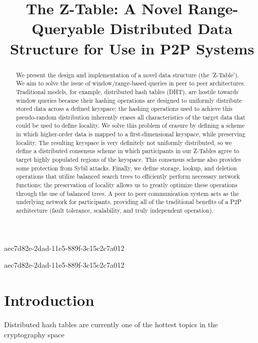 \documentclass[12pt]{article}
\title{The Z-Table: A Novel Range-Queryable Distributed Data Structure for Use in P2P Systems}
\begin{document}
aec7d82e-2dad-11e5-889f-3c15c2c7a012
\maketitle

\begin{abstract}
We present the design and implementation of a novel data structure (the 'Z-Table'). We aim to solve the issue of window/range-based queries in peer to peer architectures. Traditional models, for example,  distributed hash tables (DHT), are hostile towards window queries because their hashing operations are designed to uniformly distribute stored data across a defined keyspace; the hashing operations used to achieve this pseudo-random distribution inherently erases all characteristics of the target data that could be used to define locality. We solve this problem of erasure by defining a scheme in which higher-order data is mapped to a first-dimensional keyspace, while preserving locality. The resulting keyspace is very definitely not uniformly distributed, so we define a distributed consensus scheme in which participants in our Z-Tables agree to target highly populated regions of the keyspace. This consensus scheme also provides some protection from Sybil attacks. Finally, we define storage, lookup, and deletion operations that utilize balanced search trees to efficiently perform necessary network functions; the preservation of locality allows us to greatly optimize these operations through the use of balanced trees. A peer to peer communication system acts as the underlying network for participants, providing all of the traditional benefits of a P2P architecture (fault tolerance, scalability, and truly independent operation).
\end{abstract}
aec7d82e-2dad-11e5-889f-3c15c2c7a012

\newpage
\section{Introduction}
Distributed hash tables are currently one of the hottest topics in the cryptography space~\cite{Stoica:2001dj,Rowstron:2001ea,Ratnasamy:2001wn}

\printbibliography
\end{document}

